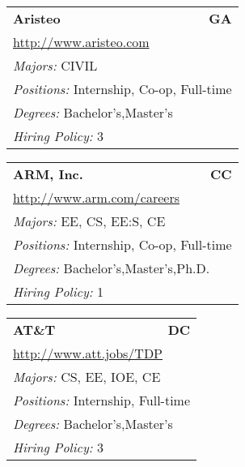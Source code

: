\documentclass[twoside]{article}
\begin{document}
\begin{center}
\begin{multicols}{3}
\begin{FlushLeft}
\begin{minipage}{\columnwidth}
\end{minipage}
 
\begin{minipage}{\columnwidth}\begin{tabularx}{.95\columnwidth}{Xr}
                 {\Large\bf Aristeo} & {\Large\bf GA}\\
    \multicolumn{2}{p{.95\columnwidth}}{\url{http://www.aristeo.com}}\\
    \multicolumn{2}{p{.95\columnwidth}}{\emph{Majors:} CIVIL}\\
    \multicolumn{2}{p{.95\columnwidth}}{\emph{Positions:} Internship, Co-op, Full-time}\\
    \multicolumn{2}{p{.95\columnwidth}}{\emph{Degrees:} Bachelor's,Master's}\\
    \multicolumn{2}{p{.95\columnwidth}}{\emph{Hiring Policy:} 3}\\
    \end{tabularx}
    
\end{minipage}
 
\begin{minipage}{\columnwidth}\begin{tabularx}{.95\columnwidth}{Xr}
                 {\Large\bf ARM, Inc.} & {\Large\bf CC}\\
    \multicolumn{2}{p{.95\columnwidth}}{\url{http://www.arm.com/careers}}\\
    \multicolumn{2}{p{.95\columnwidth}}{\emph{Majors:} EE, CS, EE:S, CE}\\
    \multicolumn{2}{p{.95\columnwidth}}{\emph{Positions:} Internship, Co-op, Full-time}\\
    \multicolumn{2}{p{.95\columnwidth}}{\emph{Degrees:} Bachelor's,Master's,Ph.D.}\\
    \multicolumn{2}{p{.95\columnwidth}}{\emph{Hiring Policy:} 1}\\
    \end{tabularx}
    
\end{minipage}
 
\begin{minipage}{\columnwidth}\begin{tabularx}{.95\columnwidth}{Xr}
                 {\Large\bf AT\&T} & {\Large\bf DC}\\
    \multicolumn{2}{p{.95\columnwidth}}{\url{http://www.att.jobs/TDP}}\\
    \multicolumn{2}{p{.95\columnwidth}}{\emph{Majors:} CS, EE, IOE, CE}\\
    \multicolumn{2}{p{.95\columnwidth}}{\emph{Positions:} Internship, Full-time}\\
    \multicolumn{2}{p{.95\columnwidth}}{\emph{Degrees:} Bachelor's,Master's}\\
    \multicolumn{2}{p{.95\columnwidth}}{\emph{Hiring Policy:} 3}\\
    \end{tabularx}
    

\end{minipage}
\end{FlushLeft}
\end{multicols}
\end{center}
\end{document}

